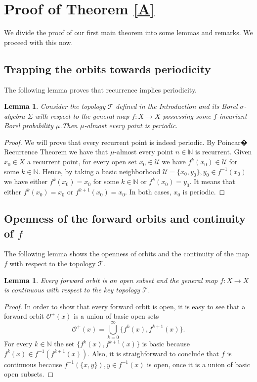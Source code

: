 \documentclass[12 pt]{amsart}
\newtheorem{lemma}[theorem]{Lemma}
\theoremstyle{definition}
\begin{document}
	\section{Proof of Theorem \ref{A}}
	We divide the proof of our first main theorem into some lemmas and remarks. We proceed with this now. 
	
	\subsection{Trapping the orbits towards periodicity}
	The following lemma proves that recurrence implies periodicity.
	\begin{lemma}\label{periodic}
		Consider the topology $\mathcal{T}$ defined in the Introduction and its Borel $\sigma$-algebra $\Sigma$ with respect to the general map $f: X \to X$ possessing some $f$-invariant Borel probability $\mu$.Then $\mu$-almost every point is periodic.
	\end{lemma}
	\begin{proof}		
		We will prove that every recurrent point is indeed periodic. By Poincar� Recurrence Theorem we have that $\mu$-almost every point  $n \in \mathbb{N}$ is recurrent. Given $x_{0} \in X$ a recurrent point, for every open set $x_{0} \in \mathcal{U}$ we have $f^{k}(x_{0}) \in \mathcal{U}$ for some $k \in \mathbb{N}$. Hence, by taking a basic neighborhood $\mathcal{U} = \{x_{0}, y_{0}\}, y_{0} \in  f^{-1}(x_{0})$ we have either $f^{k}(x_{0}) = x_{0}$ for some $k \in \mathbb{N}$ or $f^{k}(x_{0}) = y_{0}$. It means that  either $f^{k}(x_{0}) = x_{0}$ or $f^{k+1}(x_{0}) = x_{0}$. In both cases, $x_{0}$ is periodic.
	\end{proof}

		\subsection{Openness of the forward orbits and continuity of $f$}
	The following lemma shows the openness of orbits and the continuity of the map $f$ with respect to the topology $\mathcal{T}$.
	
	\begin{lemma}
		Every forward orbit is an open subset and the general map $f: X \to X$ is continuous with respect to the key topology $\mathcal{T}$.
	\end{lemma}
	\begin{proof}
		In order to show that every forward orbit is open, it is easy to see that a forward orbit $\mathcal{O}^{+}(x)$ is a union of basic open sets
		\[
		 \mathcal{O}^{+}(x)= \bigcup_{k = 0}^{\infty}\{f^{k}(x), f^{k+1}(x)\}.
		\]
		For every $k \in \mathbb{N}$ the set $\{f^{k}(x), f^{k+1}(x)\}$ is basic because $f^{k}(x) \in f^{-1}(f^{k+1}(x))$. Also, it is straighforward to conclude that $f$ is continuous because $f^{-1}(\{x,y\}), y \in f^{-1}(x)$ is open, once it is a union of basic open subsets.
	\end{proof}
\end{document}

